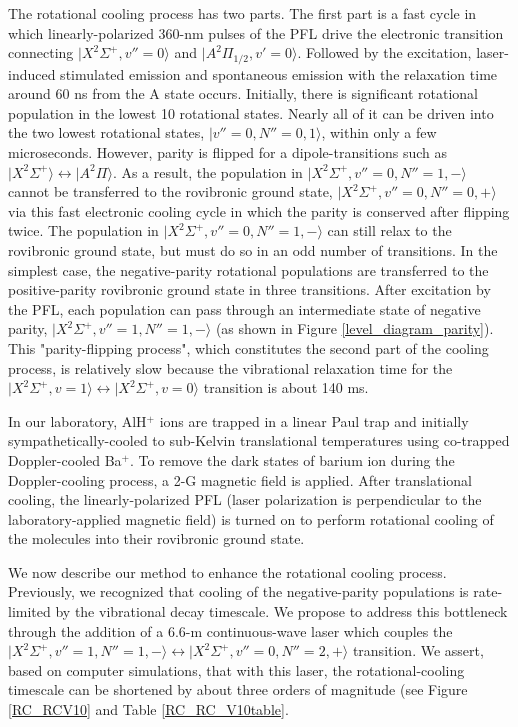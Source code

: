 \documentclass[nofootinbib,aip,jcp,reprint]{revtex4-1}
\begin{document}
The rotational cooling process has two parts. The first part is a fast cycle in which linearly-polarized 360-nm pulses of the PFL drive the electronic transition connecting $\lvert X^2\Sigma^+, v''=0\rangle$ and $\lvert A^{2}\Pi_{1/2}, v'=0\rangle$. Followed by the excitation, laser-induced stimulated emission and spontaneous emission with the relaxation time around 60 ns from the A state occurs.  Initially, there is significant rotational population in the lowest 10 rotational states. Nearly all of it can be driven into the two lowest rotational states, $\lvert v''=0, N''=0,1\rangle$, within only a few microseconds. However, parity is flipped for a dipole-transitions such as $\lvert X^2\Sigma^+\rangle \leftrightarrow \lvert A^2\Pi\rangle$. As a result, the population in $\lvert X^2\Sigma^+, v''=0, N''=1, -\rangle$ cannot be transferred to the rovibronic ground state, $\lvert X^2\Sigma^+, v''=0, N''=0, +\rangle$ via this fast electronic cooling cycle in which the parity is conserved after flipping twice. The population in $\lvert X^2\Sigma^+, v''=0, N''=1, -\rangle$ can still relax to the rovibronic ground state, but must do so in an odd number of transitions. In the simplest case, the negative-parity rotational populations are transferred to the positive-parity rovibronic ground state in three transitions. After excitation by the PFL, each population can pass through an intermediate state of negative parity, $\lvert X^2\Sigma^+, v''=1, N''=1, -\rangle$ (as shown in Figure \ref{level_diagram_parity}). This "parity-flipping process", which constitutes the second part of the cooling process, is relatively slow because the vibrational relaxation time for the $\lvert X^2\Sigma^+, v=1\rangle \leftrightarrow \lvert X^2\Sigma^+, v=0\rangle$ transition is about 140 ms.

In our laboratory, AlH$^+$ ions are trapped in a linear Paul trap and initially sympathetically-cooled to sub-Kelvin translational temperatures using co-trapped Doppler-cooled Ba$^+$. To remove the dark states of barium ion during the Doppler-cooling process, a 2-G magnetic field is applied. After translational cooling, the linearly-polarized PFL (laser polarization is perpendicular to the laboratory-applied magnetic field) is turned on to perform rotational cooling of the molecules into their rovibronic ground state.

We now describe our method to enhance the rotational cooling process. Previously, we recognized that cooling of the negative-parity populations is rate-limited by the vibrational decay timescale. We propose to address this bottleneck through the addition of a 6.6-{\micro}m continuous-wave laser which couples the $\lvert X^2\Sigma^+, v''=1, N''=1, -\rangle \leftrightarrow \lvert X^2\Sigma^+, v''=0, N''=2, +\rangle$ transition. We assert, based on computer simulations, that with this laser, the rotational-cooling timescale can be shortened by about three orders of magnitude (see Figure \ref{RC_RCV10} and Table \ref{RC_RC_V10table}.
\end{document}
